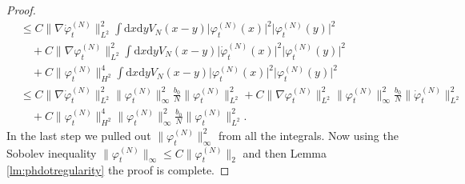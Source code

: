 \documentclass[11pt,a4paper,DIV11]{scrartcl}	%
\newcommand{\di}{\textrm{d}}		%
\newcommand{\norm}[1]{\lVert#1\rVert}	%
\newcommand{\ph}{\varphi_t^{(N)}}	%
\newcommand{\phdot}{\dot{\varphi}_t^{(N)}}	%
\begin{document}
\begin{proof}
\begin{align*}
& \leq C \norm{\nabla \phdot}_{L^2}^2 \int \di x \di y V_N(x-y) \lvert \ph(x)\rvert^2 \lvert \ph(y)\rvert^2 \\
& \quad + C \norm{\nabla \ph}_{L^2}^2 \int \di x \di y V_N(x-y) \lvert \phdot(x)\rvert^2 \lvert \ph(y)\rvert^2 \\
& \quad + C \norm{\ph}_{H^2}^4 \int \di x \di y V_N(x-y) \lvert \ph(x)\rvert^2 \lvert \ph(y)\rvert^2 \\
& \leq C \norm{\nabla \phdot}_{L^2}^2 \norm{\ph}_\infty^2 \frac{b_0}{N} \norm{\ph}_{L^2}^2 + C \norm{\nabla \ph}_{L^2}^2 \norm{\ph}_\infty^2 \frac{b_0}{N} \norm{\phdot}_{L^2}^2\\
& \quad + C \norm{\ph}_{H^2}^4 \norm{\ph}_\infty^2 \frac{b_0}{N} \norm{\ph}_{L^2}^2.
\end{align*}
In the last step we pulled out $\norm{\ph}_\infty^2$ from all the integrals. Now using the Sobolev inequality $\norm{\ph}_\infty \leq C \norm{\ph}_2$ and then Lemma \ref{lm:phdotregularity} the proof is complete.
\end{proof}
\end{document}
